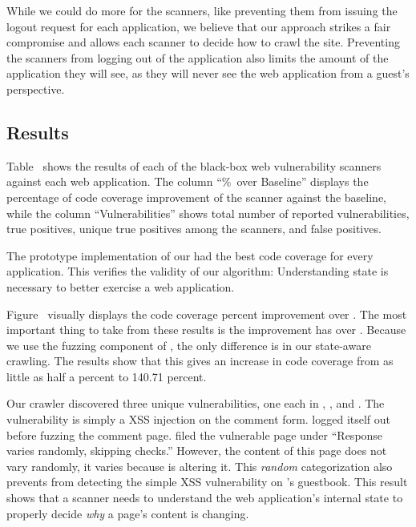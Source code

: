 While we could do more for the scanners, like preventing them from issuing the
logout request for each application, we believe that our approach strikes a
fair compromise and allows each scanner to decide how to crawl the site.
Preventing the scanners from logging out of the application also limits the
amount of the application they will see, as they will never see the web
application from a guest's perspective. 

\subsection{Results}



Table~ shows the results of each of the black-box web
vulnerability scanners against each web application. The column ``\%~over Baseline''
displays the percentage of code coverage improvement of the scanner against the
\wget{} baseline, while the column ``Vulnerabilities'' shows total number of reported
vulnerabilities, true positives, unique true positives among the scanners, and
false positives. 

The prototype implementation of our \crawler{} had the best code coverage for
every application. This verifies the validity of our algorithm: Understanding
state is necessary to better exercise a web application.

Figure~ visually displays the code coverage percent
improvement over \wget{}. The most important thing to take from these results
is the improvement \crawler{} has over \waf{}. Because we use the fuzzing
component of \waf{}, the only difference is in our state-aware crawling. The
results show that this gives \crawler{} an increase in code coverage from as
little as half a percent to 140.71 percent.

Our crawler discovered three unique vulnerabilities, one each in \phpbbtwo{},
\scarf{}, and \wackopicko{}. The \scarf{} vulnerability is simply a XSS injection
on the comment form. \waf{} logged itself out before fuzzing the comment page.
\skipfish{} filed the vulnerable page under ``Response varies
randomly, skipping checks.'' However, the content of this page does not vary
randomly, it varies because \skipfish{} is altering it. This \emph{random} categorization also prevents
\skipfish{} from detecting the simple XSS vulnerability on \wackopicko{}'s
guestbook. This result shows that a scanner needs to understand the web application's
internal state to properly decide \emph{why} a page's content is changing. 


